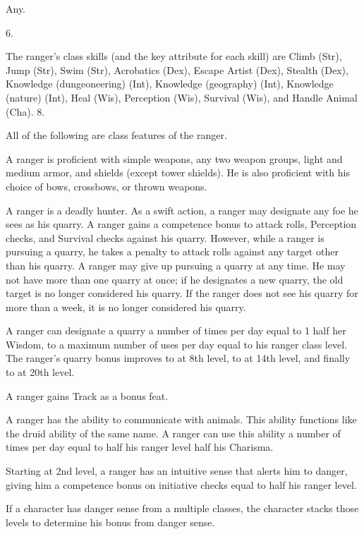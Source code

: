  Any.

 6.

The ranger's class skills (and the key attribute for each skill) are Climb (Str), Jump (Str), Swim (Str), Acrobatics (Dex), Escape Artist (Dex), Stealth (Dex), Knowledge (dungeoneering) (Int), Knowledge (geography) (Int), Knowledge (nature) (Int), Heal (Wis), Perception (Wis), Survival (Wis), and Handle Animal (Cha).
 8.


All of the following are class features of the ranger.

  A ranger is proficient with simple weapons, any two weapon groups, light and medium armor, and shields (except tower shields).   He is also proficient with his choice of bows, crossbows, or thrown weapons.

 A ranger is a deadly hunter. As a swift action, a ranger may designate any foe he sees as his quarry. A ranger gains a  competence bonus to attack rolls, Perception checks, and Survival checks against his quarry. However, while a ranger is pursuing a quarry, he takes a  penalty to attack rolls against any target other than his quarry. A ranger may give up pursuing a quarry at any time. He may not have more than one quarry at once; if he designates a new quarry, the old target is no longer considered his quarry. If the ranger does not see his quarry for more than a week, it is no longer considered his quarry.

\par A ranger can designate a quarry a number of times per day equal to 1 \add half her Wisdom, to a maximum number of uses per day equal to his ranger class level. The ranger's quarry bonus improves to  at 8th level, to  at 14th level, and finally to  at 20th level.

 A ranger gains Track as a bonus feat.

 A ranger has the ability to communicate with animals. This ability functions like the druid ability of the same name. A ranger can use this ability a number of times per day equal to half his ranger level \add half his Charisma.

 Starting at 2nd level, a ranger has an intuitive sense that alerts him to danger, giving him a competence bonus on initiative checks equal to half his ranger level.
\par If a character has danger sense from a multiple classes, the character stacks those levels to determine his bonus from danger sense.

